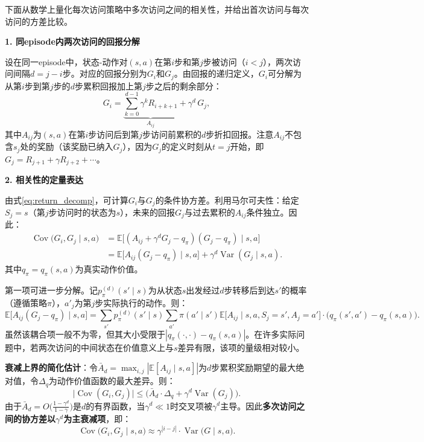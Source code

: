 \documentclass[UTF8]{article}
\begin{document}
\begin{remarkbox}
下面从数学上量化每次访问策略中多次访问之间的相关性，并给出首次访问与每次访问的方差比较。

\smallskip
\noindent\textbf{1. 同episode内两次访问的回报分解}

设在同一episode中，状态-动作对$(s,a)$在第$i$步和第$j$步被访问（$i < j$），两次访问间隔$d = j - i$步。对应的回报分别为$G_i$和$G_j$。由回报的递归定义，$G_i$可分解为从第$i$步到第$j$步的$d$步累积回报加上第$j$步之后的剩余部分：
\begin{equation}
\label{eq:return_decomp}
G_i = \underbrace{\sum_{k=0}^{d-1} \gamma^k R_{i+k+1}}_{A_{ij}} + \gamma^{d} \, G_j,
\end{equation}
其中$A_{ij}$为$(s,a)$在第$i$步访问后到第$j$步访问前累积的$d$步折扣回报。注意$A_{ij}$不包含$s_j$处的奖励（该奖励已纳入$G_j$），因为$G_j$的定义时刻从$t=j$开始，即$G_j = R_{j+1} + \gamma R_{j+2} + \cdots$。

\smallskip
\noindent\textbf{2. 相关性的定量表达}

由式\eqref{eq:return_decomp}，可计算$G_i$与$G_j$的条件协方差。利用马尔可夫性：给定$S_j = s$（第$j$步访问时的状态为$s$），未来的回报$G_j$与过去累积的$A_{ij}$条件独立。因此：
\begin{equation}
\label{eq:cov_decomp}
\begin{aligned}
\operatorname{Cov}\bigl(G_i, G_j \mid s,a\bigr)
&= \mathbb{E}\bigl[(A_{ij} + \gamma^d G_j - q_\pi)(G_j - q_\pi) \mid s,a\bigr] \\
&= \mathbb{E}\bigl[A_{ij}(G_j - q_\pi) \mid s,a\bigr] + \gamma^d \operatorname{Var}(G_j \mid s,a) .
\end{aligned}
\end{equation}
其中$q_\pi = q_\pi(s,a)$为真实动作价值。

第一项可进一步分解。记$p_\pi^{(d)}(s' \mid s)$为从状态$s$出发经过$d$步转移后到达$s'$的概率（遵循策略$\pi$），$a'_j$为第$j$步实际执行的动作。则：
\[
\mathbb{E}\bigl[A_{ij}(G_j - q_\pi) \mid s,a\bigr]
= \sum_{s'} p_\pi^{(d)}(s' \mid s) \sum_{a'} \pi(a' \mid s') \mathbb{E}\bigl[A_{ij} \mid s,a, S_j=s', A_j=a'\bigr] \cdot \bigl(q_\pi(s',a') - q_\pi(s,a)\bigr).
\]
虽然该耦合项一般不为零，但其大小受限于$|q_\pi(\cdot,\cdot) - q_\pi(s,a)|$。在许多实际问题中，若两次访问的中间状态在价值意义上与$s$差异有限，该项的量级相对较小。

\textbf{衰减上界的简化估计}：令$\bar{A}_d = \max_{i,j} |\mathbb{E}[A_{ij} \mid s,a]|$为$d$步累积奖励期望的最大绝对值，令$\Delta_q$为动作价值函数的最大差异。则：
\begin{equation}
\label{eq:cov_bound}
\bigl|\operatorname{Cov}(G_i, G_j)\bigr| \le \bigl(\bar{A}_d \cdot \Delta_q + \gamma^d \operatorname{Var}(G_j)\bigr).
\end{equation}
由于$\bar{A}_d = O\bigl(\frac{1 - \gamma^d}{1-\gamma}\bigr)$是$d$的有界函数，当$\gamma^d \ll 1$时交叉项被$\gamma^d$主导。因此\textbf{多次访问之间的协方差以$\gamma^d$为主衰减项}，即：
\begin{equation}
\label{eq:cov_approx}
\operatorname{Cov}\bigl(G_i, G_j \mid s,a\bigr) \approx \gamma^{|i-j|} \cdot \operatorname{Var}\bigl(G \mid s,a\bigr).
\end{equation}


\end{remarkbox}
\end{document}
